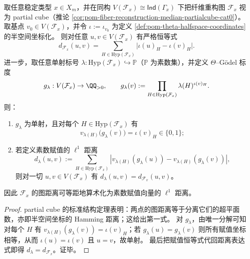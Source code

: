 \begin{theorem}\label{thm:pom-theta-godelization-prime-valuation-isometry}
取任意稳定类型 \(x\in X_m\)，并在同构 \(V(\mathcal F_x)\cong \mathsf{Ind}(\Gamma_x)\) 下把纤维重构图 \(\mathcal F_x\) 视为 partial cube（推论 \ref{cor:pom-fiber-reconstruction-median-partialcube-cat0}）。
取基点 \(v_0\in V(\mathcal F_x)\)，并令 \(\iota:=\iota_{v_0}\) 为定义 \ref{def:pom-theta-halfspace-coordinates} 的半空间坐标化。
则对任意 \(u,v\in V(\mathcal F_x)\) 有严格恒等式
\[
\boxed{\;
d_{\mathcal F_x}(u,v)=\sum_{H\in\mathrm{Hyp}(\mathcal F_x)}
\bigl|\iota(u)_H-\iota(v)_H\bigr|. \;}
\]
进一步，取任意单射标号 \(\lambda:\mathrm{Hyp}(\mathcal F_x)\hookrightarrow\mathbb P\)（\(\mathbb P\) 为素数集），并定义 \(\Theta\)--Gödel 标度
\[
g_\lambda:V(\mathcal F_x)\to\QQ_{>0},\qquad
g_\lambda(v):=\prod_{H\in\mathrm{Hyp}(\mathcal F_x)}\lambda(H)^{\iota(v)_H}.
\]
则：
\begin{enumerate}
  \item \(g_\lambda\) 为单射，且对每个 \(H\in\mathrm{Hyp}(\mathcal F_x)\) 有
  \[
  v_{\lambda(H)}\bigl(g_\lambda(v)\bigr)=\iota(v)_H\in\{0,1\};
  \]
  \item 若定义素数赋值的 \(\ell^1\) 距离
  \[
  d_\lambda(u,v):=\sum_{H\in\mathrm{Hyp}(\mathcal F_x)}
  \left|v_{\lambda(H)}(g_\lambda(u))-v_{\lambda(H)}(g_\lambda(v))\right|,
  \]
  则对一切 \(u,v\in V(\mathcal F_x)\) 有 \(d_\lambda(u,v)=d_{\mathcal F_x}(u,v)\)。
\end{enumerate}
因此 \(\mathcal F_x\) 的图距离可等距地算术化为素数赋值向量的 \(\ell^1\) 距离。
\end{theorem}
\begin{proof}
partial cube 的标准结构定理表明：两点的图距离等于分离它们的超平面数，亦即半空间坐标的 Hamming 距离；这给出第一式。
对 \(g_\lambda\)，由唯一分解可知对每个 \(H\) 有 \(v_{\lambda(H)}(g_\lambda(v))=\iota(v)_H\)；若 \(g_\lambda(u)=g_\lambda(v)\) 则所有赋值坐标相等，从而 \(\iota(u)=\iota(v)\) 且 \(u=v\)，故单射。
最后把赋值恒等式代回距离表达式即得 \(d_\lambda=d_{\mathcal F_x}\)。证毕。
\end{proof}

